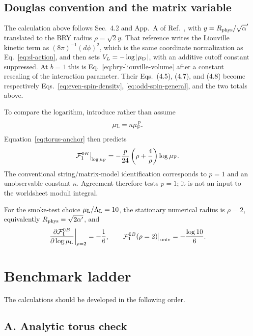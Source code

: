 \documentclass[11pt]{article}
\newcommand{\ap}{\alpha'}
\begin{document}
\subsection{Douglas convention and the matrix variable}

The calculation above follows Sec.~4.2 and App.~A of
Ref.~\cite{DouglasEtAl2003NewHat}, with $y=R_{\rm phys}/\sqrt\ap$
translated to the BRY radius $\rho=\sqrt2y$.  That reference writes the
Liouville kinetic term as
$(8\pi)^{-1}(d\phi)^2$, which is the same coordinate normalization as
Eq.~\eqref{eq:sl-action}, and then sets
$V_L=-\log|\mu_{\rm D}|$, with an additive cutoff constant suppressed.
At $b=1$ this is Eq.~\eqref{eq:bry-liouville-volume} after a constant
rescaling of the interaction parameter.  Their Eqs.~(4.5), (4.7), and
(4.8) become respectively Eqs.~\eqref{eq:even-spin-density},
\eqref{eq:odd-spin-general}, and the two totals above.

To compare the logarithm, introduce rather than assume
\begin{equation}
 \mu_{\rm L}=\kappa\mu_{\rm F}^{\,p}.
 \label{eq:liouville-fermi-map}
\end{equation}
Equation~\eqref{eq:torus-anchor} then predicts
\begin{equation}
 \mathcal F^{0B}_1\big|_{\log\mu_{\rm F}}
 =-\frac p{24}\left(\rho+\frac4\rho\right)\log\mu_{\rm F}.
 \label{eq:torus-fermi-comparison}
\end{equation}
The conventional string/matrix-model identification corresponds to
$p=1$ and an unobservable constant $\kappa$.  Agreement therefore tests
$p=1$; it is not an input to the worldsheet moduli integral.

For the smoke-test choice
$\mu_{\rm L}/\Lambda_{\rm L}=10$, the stationary numerical radius is
$\rho=2$, equivalently $R_{\rm phys}=\sqrt{2\ap}$, and
\begin{equation}
 \frac{\partial\mathcal F^{0B}_1}
 {\partial\log\mu_{\rm L}}\bigg|_{\rho=2}
 =-\frac16,
 \qquad
 \mathcal F^{0B}_1(\rho=2)\big|_{\rm univ}
 =-\frac{\log10}{6}.
 \label{eq:numerical-anchor}
\end{equation}

\section{Benchmark ladder}

The calculations should be developed in the following order.

\subsection*{A. Analytic torus check}
\end{document}

